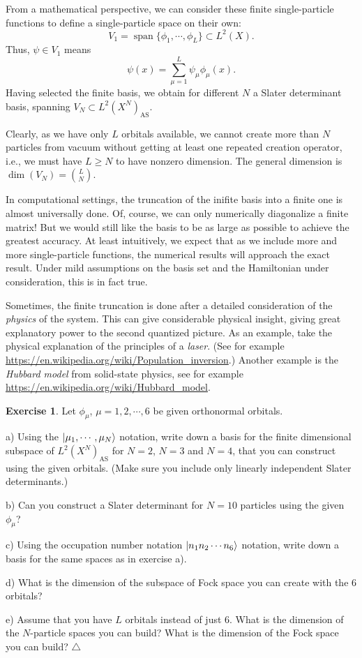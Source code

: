 \documentclass{report}
\theoremstyle{plain}
\theoremstyle{definition}
\newtheorem{exerc}{Exercise}[chapter]
\newcommand\xqed[1]{%
  \leavevmode\unskip\penalty9999 \hbox{}\nobreak\hfill
  \quad\hbox{#1}}
\newcommand\demo{\xqed{$\triangle$}}
\newenvironment{exercise}{\bigskip\begin{exerc}}{\demo\end{exerc}\bigskip}
\begin{document}
From a mathematical perspective, we can consider these finite
single-particle functions to define a single-particle space on their
own:
\begin{equation}
  V_1 = \operatorname{span}\{\phi_1,\cdots,\phi_L\} \subset L^2(X).
\end{equation}
Thus, $\psi\in V_1$ means
\[ \psi(x) = \sum_{\mu=1}^L \psi_\mu \phi_\mu(x). \]
Having selected the finite basis, we obtain for different $N$ a Slater
determinant basis, spanning $V_N \subset L^2(X^N)_\text{AS}$.

Clearly, as we have only $L$ orbitals available, we cannot create more
than $N$ particles from vacuum without getting at least one repeated
creation operator, i.e., we must have $L \geq N$ to have nonzero
dimension. The general dimension is $\dim(V_N) = \binom{L}{N}$.

In computational settings, the truncation of the inifite basis into a
finite one is almost universally done. Of, course, we can only
numerically diagonalize a finite matrix! But we would still like the
basis to be as large as possible to achieve the greatest accuracy. At
least intuitively, we expect that as we include more and more
single-particle functions, the numerical results will approach the
exact result. Under mild assumptions on the basis set and the
Hamiltonian under consideration, this is in fact true. 

Sometimes, the finite truncation is done after a detailed
consideration of the \emph{physics} of the system. This can give
considerable physical insight, giving great explanatory power to the
second quantized picture. As an example, take the physical explanation
of the principles of a \emph{laser}. (See for example
\url{https://en.wikipedia.org/wiki/Population_inversion}.) Another
example is the \emph{Hubbard model} from solid-state physics, see for example
\url{https://en.wikipedia.org/wiki/Hubbard_model}. 


\begin{exercise}\label{exercise:finite}
  Let $\phi_\mu$, $\mu=1,2,\cdots,6$ be given orthonormal orbitals.

  a) Using the $\ket{\mu_1,\cdots,\mu_N}$ notation, write down a basis
  for the finite dimensional subspace of $L^2(X^N)_\text{AS}$ for
  $N=2$, $N=3$ and 
  $N=4$, that you can construct using the given orbitals. (Make sure
  you include only linearly independent Slater determinants.)

  b) Can you construct a Slater determinant for $N=10$ particles using
  the given $\phi_\mu$?

  c) Using the occupation number notation $\ket{n_1 n_2 \cdots n_6}$
  notation, write down a basis for the same spaces as in exercise a).

  d) What is the dimension of the subspace of Fock space you can
  create with the $6$ orbitals?

  e) Assume that you have $L$ orbitals instead of just $6$. What is
  the dimension of the $N$-particle spaces you can build? What is the
  dimension of the Fock space you can build?
\end{exercise}
\end{document}
